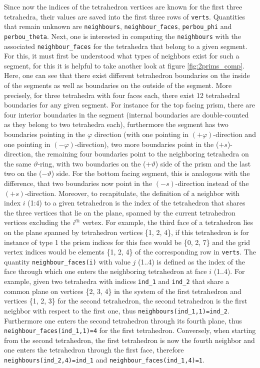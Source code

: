 \documentclass[./main.tex]{subfiles}
\begin{document}
Since now the indices of the tetrahedron vertices are known for the first three tetrahedra, their values are saved into the first three rows of \texttt{verts}. Quantities that remain unknown are \texttt{neighbours}, \texttt{neighbour\_faces}, \texttt{perbou\_phi} and \texttt{perbou\_theta}. Next, one is interested in computing the \texttt{neighbours} with the associated \texttt{neighbour\_faces} for the tetrahedra that belong to a given segment. For this, it must first be understood what types of neighbors exist for such a segment, for this it is helpful to take another look at figure \ref{fig:2prims_comp}. Here, one can see that there exist different tetrahedron boundaries on the inside of the segments as well as boundaries on the outside of the segment. More precisely, for three tetrahedra with four faces each, there exist 12 tetrahedral boundaries for any given segment. For instance for the top facing prism, there are four interior boundaries in the segment (internal boundaries are double-counted as they belong to two tetrahedra each), furthermore the segment has two boundaries pointing in the $\varphi$ direction (with one pointing in $(+\varphi)$-direction and one pointing in $(-\varphi)$-direction), two more boundaries point in the ($+s$)-direction, the remaining four boundaries point to the neighboring tetrahedra on the same $\vartheta$-ring, with two boundaries on the ($+\vartheta$) side of the prism and the last two on the ($-\vartheta$) side. For the bottom facing segment, this is analogous with the difference, that two boundaries now point in the $(-s)$-direction instead of the  $(+s)$-direction. Moreover, to recapitulate, the definition of a neighbor with index $i$ (1:4) to a given tetrahedron is the index of the tetrahedron that shares the three vertices that lie on the plane, spanned by the current tetrahedron vertices excluding the $i^{th}$ vertex. For example, the third face of a tetrahedron lies on the plane spanned by tetrahedron vertices \{1, 2, 4\}, if this tetrahedron is for instance of type 1 the prism indices for this face would be \{0, 2, 7\} and the grid vertex indices would be elements \{1, 2, 4\} of the corresponding row in \texttt{verts}. The quantity \texttt{neighbour\_faces(i)} with value $j$ (1..4) is defined as the index of the face through which one enters the neighboring tetrahedron at face $i$ (1..4). For example, given two tetrahedra with indices \texttt{ind\_1} and \texttt{ind\_2} that share a common plane on vertices \{2, 3, 4\} in the system of the first tetrahedron and vertices \{1, 2, 3\} for the second tetrahedron, the second tetrahedron is the first neighbor with respect to the first one, thus \texttt{neighbours(ind\_1,1)=ind\_2}. Furthermore one enters the second tetrahedron through its fourth plane, thus \texttt{neighbour\_faces(ind\_1,1)=4} for the first tetrahedron. Conversely, when starting from the second tetrahedron, the first tetrahedron is now the fourth neighbor and one enters the tetrahedron through the first face, therefore \texttt{neighbours(ind\_2,4)=ind\_1} and \texttt{neighbour\_faces(ind\_1,4)=1}.
\end{document}
